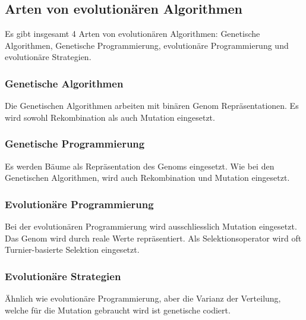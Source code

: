   \subsection{Arten von evolutionären Algorithmen\label{sub:artenEvAlgos}}

    Es gibt insgesamt 4 Arten von evolutionären Algorithmen:
    Genetische Algorithmen, Genetische Programmierung, evolutionäre Programmierung
    und evolutionäre Strategien.

    \subsubsection{Genetische Algorithmen\label{item:genAlgo}}

      Die Genetischen Algorithmen arbeiten mit binären Genom Repräsentationen.
      Es wird sowohl Rekombination als auch Mutation eingesetzt.

    \subsubsection{Genetische Programmierung\label{item:genProg}}

      Es werden Bäume als Repräsentation des Genoms eingesetzt. Wie bei den Genetischen Algorithmen,
      wird auch Rekombination und Mutation eingesetzt.

    \subsubsection{Evolutionäre Programmierung\label{item:evProg}}

      Bei der evolutionären Programmierung wird ausschliesslich Mutation eingesetzt.
      Das Genom wird durch reale Werte repräsentiert. Als Selektionsoperator wird
      oft Turnier-basierte Selektion eingesetzt.

    \subsubsection{Evolutionäre Strategien\label{item:evStrat}}

        Ähnlich wie evolutionäre Programmierung, aber die Varianz der Verteilung,
        welche für die Mutation gebraucht wird ist genetische codiert.
